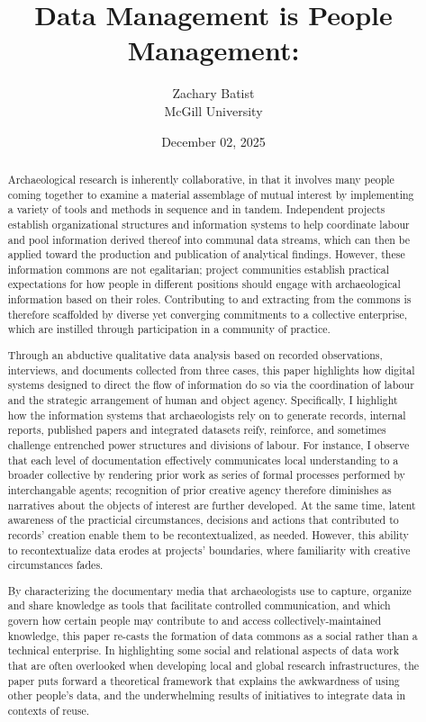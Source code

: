 \documentclass[
  canadian,
]{article}
\title{Data Management is People Management:}
\author{
      {Zachary
Batist \orcidlink{0000-0003-0435-508X} \href{mailto:zachary.batist@mcgill.ca}{\Letter}} \\
          McGill University
     \\
  }
\date{December 02, 2025}
\begin{document}
\maketitle
\begin{abstract}
Archaeological research is inherently collaborative, in that it involves
many people coming together to examine a material assemblage of mutual
interest by implementing a variety of tools and methods in sequence and
in tandem. Independent projects establish organizational structures and
information systems to help coordinate labour and pool information
derived thereof into communal data streams, which can then be applied
toward the production and publication of analytical findings. However,
these information commons are not egalitarian; project communities
establish practical expectations for how people in different positions
should engage with archaeological information based on their roles.
Contributing to and extracting from the commons is therefore scaffolded
by diverse yet converging commitments to a collective enterprise, which
are instilled through participation in a community of practice.

Through an abductive qualitative data analysis based on recorded
observations, interviews, and documents collected from three cases, this
paper highlights how digital systems designed to direct the flow of
information do so via the coordination of labour and the strategic
arrangement of human and object agency. Specifically, I highlight how
the information systems that archaeologists rely on to generate records,
internal reports, published papers and integrated datasets reify,
reinforce, and sometimes challenge entrenched power structures and
divisions of labour. For instance, I observe that each level of
documentation effectively communicates local understanding to a broader
collective by rendering prior work as series of formal processes
performed by interchangable agents; recognition of prior creative agency
therefore diminishes as narratives about the objects of interest are
further developed. At the same time, latent awareness of the practicial
circumstances, decisions and actions that contributed to records'
creation enable them to be recontextualized, as needed. However, this
ability to recontextualize data erodes at projects' boundaries, where
familiarity with creative circumstances fades.

By characterizing the documentary media that archaeologists use to
capture, organize and share knowledge as tools that facilitate
controlled communication, and which govern how certain people may
contribute to and access collectively-maintained knowledge, this paper
re-casts the formation of data commons as a social rather than a
technical enterprise. In highlighting some social and relational aspects
of data work that are often overlooked when developing local and global
research infrastructures, the paper puts forward a theoretical framework
that explains the awkwardness of using other people's data, and the
underwhelming results of initiatives to integrate data in contexts of
reuse.
\end{abstract}
\end{document}
